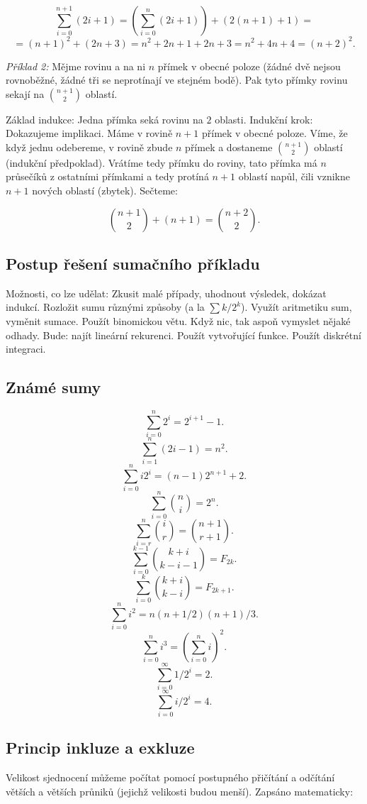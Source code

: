 $$ \sum_{i=0}^{n+1} (2i+1) = \left( \sum_{i=0}^n (2i+1) \right) + \left(2(n+1)+1\right) = $$
$$ = (n+1)^2 + (2n+3) = n^2 + 2n +1 + 2n + 3 = n^2 + 4n + 4 = (n+2)^2. $$

{\it Příklad 2:} Mějme rovinu a na ni $n$ přímek v obecné poloze
(žádné dvě nejsou rovnoběžné, žádné tři se neprotínají ve stejném
bodě). Pak tyto přímky rovinu sekají na ${n+1 \choose 2}$ oblastí.

\itemize\ibull
\: Základ indukce: Jedna přímka seká rovinu na $2$ oblasti.
\: Indukční krok: Dokazujeme implikaci. Máme v rovině $n+1$ přímek v
obecné poloze. Víme, že když jednu odebereme, v rovině zbude $n$
přímek a dostaneme ${n+1 \choose 2}$ oblastí (indukční
předpoklad). Vrátíme tedy přímku do roviny, tato přímka má $n$
průsečíků z ostatními přímkami a tedy protíná $n+1$ oblastí napůl,
čili vznikne $n+1$ nových oblastí (zbytek). Sečteme:
\endlist

$${n+1 \choose 2} + (n+1) = {n+2 \choose 2}.$$ 


\subsection{Postup řešení sumačního příkladu}
Možnosti, co lze udělat:
\itemize\ibull
\: Zkusit malé případy, uhodnout výsledek, dokázat indukcí.
\: Rozložit sumu různými způsoby (a la $\sum k/2^k$).
\: Využít aritmetiku sum, vyměnit sumace.
\: Použít binomickou větu.
\: Když nic, tak aspoň vymyslet nějaké odhady.
\: Bude: najít lineární rekurenci.
\: Použít vytvořující funkce.
\: Použít diskrétní integraci.
\endlist

\subsection{Známé sumy}
$$\sum_{i=0}^n 2^i = 2^{i+1}-1. $$
$$\sum_{i=1}^n (2i-1) = n^2.$$
$$\sum_{i=0}^n i2^i = (n-1)2^{n+1} + 2.$$
$$\sum_{i=0}^n {n \choose i} = 2^n.$$
$$\sum_{i=r}^n {i \choose r} = {n+1 \choose r+1}.$$
$$\sum_{i=0}^{k-1} {k+i \choose k-i-1} = F_{2k}. $$
$$\sum_{i=0}^{k} {k+i \choose k-i} = F_{2k+1}. $$
$$\sum_{i=0}^n i^2 = n(n+1/2)(n+1)/3. $$
$$\sum_{i=0}^n i^3 = (\sum_{i=0}^n i)^2.$$
$$\sum_{i=0}^\infty 1/2^i = 2. $$
$$\sum_{i=0}^\infty i/2^i = 4. $$

\subsection{Princip inkluze a exkluze}
Velikost sjednocení mů\-že\-me po\-čí\-tat pomocí postupného při\-čí\-tá\-ní a odčítání větších
a větších průniků (jejichž velikosti budou menší). Zapsáno matematicky:

